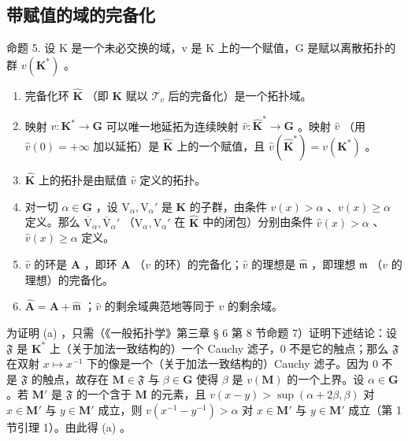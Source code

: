 \subsection{带赋值的域的完备化}

命题 5. 设 K 是一个未必交换的域，v 是 K 上的一个赋值，G 是赋以离散拓扑的群 \(v(\mathbf{K}^{*})\) 。

\begin{enumerate}
\def\labelenumi{(\alph{enumi})}
\item
  完备化环 \(\hat{\mathbf{K}}\) （即 \(\mathbf{K}\) 赋以 \(\mathcal{T}_v\) 后的完备化）是一个拓扑域。
\item
  映射 \(v: \mathbf{K}^* \to \mathbf{G}\) 可以唯一地延拓为连续映射 \(\hat{v}: \hat{\mathbf{K}}^* \to \mathbf{G}\) 。映射 \(\hat{v}\) （用 \(\hat{v}(0) = +\infty\) 加以延拓）是 \(\hat{\mathbf{K}}\) 上的一个赋值，且 \(\hat{v}(\hat{\mathbf{K}}^*) = v(\mathbf{K}^*)\) 。
\item
  \(\hat{\mathbf{K}}\) 上的拓扑是由赋值 \(\hat{v}\) 定义的拓扑。
\item
  对一切 \(\alpha \in \mathbf{G}\) ，设 \(\mathrm{V}_{\alpha}, \mathrm{V}_{\alpha}'\) 是 \(\mathbf{K}\) 的子群，由条件 \(v(x) > \alpha\) 、\(v(x) \geqslant \alpha\) 定义。那么 \(\overline{\mathrm{V}}_{\alpha}, \overline{\mathrm{V}}_{\alpha}'\) （\(\mathrm{V}_{\alpha}, \mathrm{V}_{\alpha}'\) 在 \(\hat{\mathbf{K}}\) 中的闭包）分别由条件 \(\hat{v}(x) > \alpha\) 、\(\hat{v}(x) \geqslant \alpha\) 定义。
\item
  \(\hat{v}\) 的环是 \(\hat{\mathbf{A}}\) ，即环 \(\mathbf{A}\) （\(v\) 的环）的完备化；\(\hat{v}\) 的理想是 \(\hat{\mathfrak{m}}\) ，即理想 \(\mathfrak{m}\) （\(v\) 的理想）的完备化。
\item
  \(\hat{\mathbf{A}} = \mathbf{A} + \hat{\mathfrak{m}}\) ；\(\hat{v}\) 的剩余域典范地等同于 \(v\) 的剩余域。
\end{enumerate}

为证明 (a) ，只需（《一般拓扑学》第三章 § 6 第 8 节命题 7）证明下述结论：设 \(\mathfrak{F}\) 是 \(\mathbf{K}^*\) 上（关于加法一致结构的）一个 Cauchy 滤子，0 不是它的触点；那么 \(\mathfrak{F}\) 在双射 \(x \mapsto x^{-1}\) 下的像是一个（关于加法一致结构的）Cauchy 滤子。因为 0 不是 \(\mathfrak{F}\) 的触点，故存在 \(\mathbf{M} \in \mathfrak{F}\) 与 \(\beta \in \mathbf{G}\) 使得 \(\beta\) 是 \(v(\mathbf{M})\) 的一个上界。设 \(\alpha \in \mathbf{G}\) 。若 \(\mathbf{M}'\) 是 \(\mathfrak{F}\) 的一个含于 \(\mathbf{M}\) 的元素，且 \(v(x - y) > \sup (\alpha + 2\beta, \beta)\) 对 \(x \in \mathbf{M}'\) 与 \(y \in \mathbf{M}'\) 成立，则 \(v(x^{-1} - y^{-1}) > \alpha\) 对 \(x \in \mathbf{M}'\) 与 \(y \in \mathbf{M}'\) 成立（第 1 节引理 1）。由此得 (a) 。

